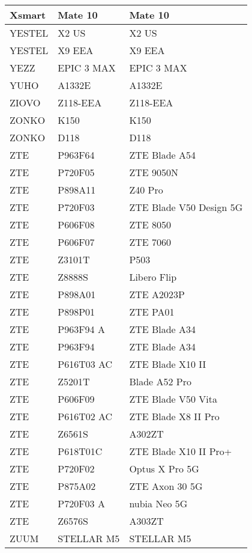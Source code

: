 \begin{tabularx}{\linewidth}{|l|X|X|}
        Xsmart & Mate 10 & Mate 10 \\ \hline
        YESTEL & X2 US & X2 US \\ \hline
        YESTEL & X9 EEA & X9 EEA \\ \hline
        YEZZ & EPIC 3 MAX & EPIC 3 MAX \\ \hline
        YUHO & A1332E & A1332E \\ \hline
        ZIOVO & Z118-EEA & Z118-EEA \\ \hline
        ZONKO & K150 & K150 \\ \hline
        ZONKO & D118 & D118 \\ \hline
        ZTE & P963F64 & ZTE Blade A54 \\ \hline
        ZTE & P720F05 & ZTE 9050N \\ \hline
        ZTE & P898A11 & Z40 Pro \\ \hline
        ZTE & P720F03 & ZTE Blade V50 Design 5G \\ \hline
        ZTE & P606F08 & ZTE 8050 \\ \hline
        ZTE & P606F07 & ZTE 7060 \\ \hline
        ZTE & Z3101T & P503 \\ \hline
        ZTE & Z8888S & Libero Flip \\ \hline
        ZTE & P898A01 & ZTE A2023P \\ \hline
        ZTE & P898P01 & ZTE PA01 \\ \hline
        ZTE & P963F94 A & ZTE Blade A34 \\ \hline
        ZTE & P963F94 & ZTE Blade A34 \\ \hline
        ZTE & P616T03 AC & ZTE Blade X10 II \\ \hline
        ZTE & Z5201T & Blade A52 Pro \\ \hline
        ZTE & P606F09 & ZTE Blade V50 Vita \\ \hline
        ZTE & P616T02 AC & ZTE Blade X8 II Pro \\ \hline
        ZTE & Z6561S & A302ZT \\ \hline
        ZTE & P618T01C & ZTE Blade X10 II Pro+ \\ \hline
        ZTE & P720F02 & Optus X Pro 5G \\ \hline
        ZTE & P875A02 & ZTE Axon 30 5G \\ \hline
        ZTE & P720F03 A & nubia Neo 5G \\ \hline
        ZTE & Z6576S & A303ZT \\ \hline
        ZUUM & STELLAR M5 & STELLAR M5 \\ \hline

\end{tabularx}
